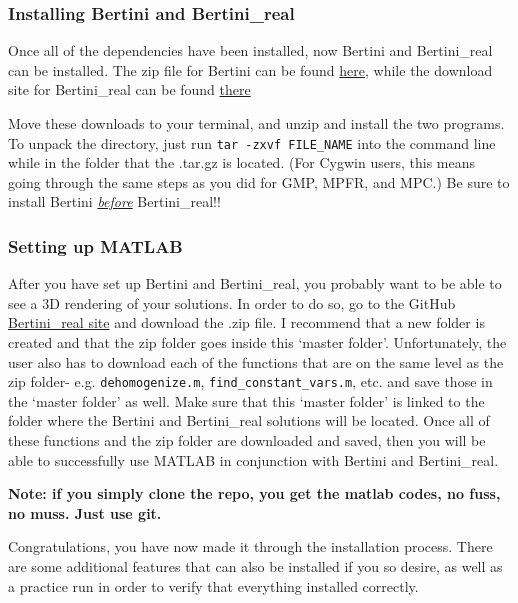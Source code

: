 \clearpage
	\subsubsection{Installing Bertini and Bertini\_real}

Once all of the dependencies have been installed, now Bertini and Bertini\_real can be installed. The zip file for Bertini can be found
\href{http://bertini.nd.edu/download.html}{here}, while the download site for Bertini\_real can be found
\href{http://www.bertinireal.com/download.html}{there}

Move these downloads to your terminal, and unzip and install the two programs. To unpack the directory, just run \texttt{tar -zxvf FILE\_NAME} into the command line while in the folder that the .tar.gz is located. (For Cygwin users, this means going through the same steps as you did for GMP, MPFR, and MPC.) Be sure to install Bertini \textit{\underline{before}} Bertini\_real!!


	\subsubsection{Setting up MATLAB}
After you have set up Bertini and Bertini\_real, you probably want to be able to see a 3D rendering of your solutions. In order to do so, go to the GitHub  \href{https://github.com/ofloveandhate/bertini_real/tree/master/matlab_codes}{Bertini\_real site} and download the .zip file. I recommend that a new folder is created and that the zip folder goes inside this `master folder'. Unfortunately, the user also has to download each of the functions that are on the same level as the zip folder- e.g. \texttt{dehomogenize.m}, \texttt{find\_constant\_vars.m}, etc. and save those in the `master folder' as well. Make sure that this `master folder' is linked to the folder where the Bertini and Bertini\_real solutions will be located. Once all of these functions and the zip folder are downloaded and saved, then you will be able to successfully use MATLAB in conjunction with Bertini and Bertini\_real. 


{\bf Note: if you simply clone the repo, you get the matlab codes, no fuss, no muss.  Just use git.}

\begin{centering}
Congratulations, you have now made it through the installation process. There are some additional features that can also be installed if you so desire, as well as a practice run in order to verify that everything installed correctly.
\end{centering}